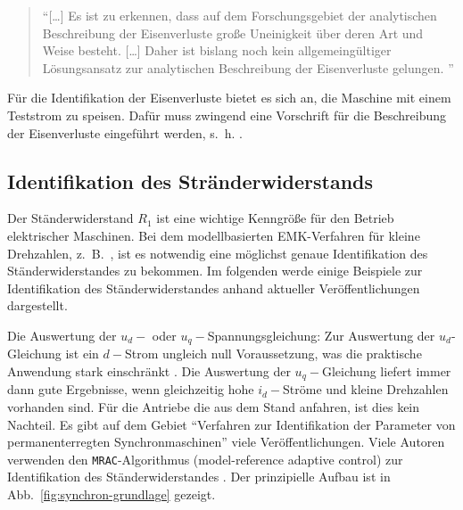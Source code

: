 \documentclass[conference,twocolumn]{IEEEtran}
\begin{document}
\begin{quote}
\enquote{[\ldots] Es ist zu erkennen, dass auf dem Forschungsgebiet der analytischen Beschreibung
der Eisenverluste große Uneinigkeit über deren Art und Weise besteht. [\ldots] Daher ist bislang
noch kein allgemeingültiger Lösungsansatz zur analytischen Beschreibung der
Eisenverluste gelungen. \autocite[S.~65]{Kellner2012}} 
\end{quote}

Für die Identifikation der Eisenverluste bietet es sich an, die Maschine mit einem Teststrom zu speisen.
Dafür muss zwingend eine Vorschrift für die Beschreibung der Eisenverluste eingeführt werden, s.~h. \autocite[S.~75]{Kellner2012}.

\subsection{Identifikation des Stränderwiderstands}\label{sec:stator-ident}

Der Ständerwiderstand $R_1$ ist eine wichtige Kenngröße für den Betrieb elektrischer Maschinen.
Bei dem modellbasierten EMK-Verfahren für kleine Drehzahlen, z.\ B.\ \autocite{genduso}, ist es notwendig eine möglichst genaue Identifikation des Ständerwiderstandes zu bekommen.
Im folgenden werde einige Beispiele zur Identifikation des Ständerwiderstandes anhand aktueller Veröffentlichungen dargestellt.

Die Auswertung der $u_d-$ oder $u_q-$Spannungsgleichung: Zur Auswertung der $u_d$-Gleichung ist ein $d-$Strom ungleich null Voraussetzung, was die praktische Anwendung stark einschränkt \autocite{Kellner2012}.
Die Auswertung der $u_q-$Gleichung liefert immer dann gute Ergebnisse, wenn gleichzeitig hohe $i_d-$Ströme und kleine Drehzahlen vorhanden sind.
Für die Antriebe die aus dem Stand anfahren, ist dies kein Nachteil.
Es gibt auf dem Gebiet \enquote{Verfahren zur Identifikation der Parameter von permanenterregten Synchronmaschinen} viele Veröffentlichungen.
Viele Autoren verwenden den \texttt{MRAC}-Algorithmus (model-reference adaptive control) zur Identifikation des Ständerwiderstandes \autocite{slotine_applied_1991}.
Der prinzipielle Aufbau ist in Abb.~\ref{fig:synchron-grundlage} gezeigt.
\end{document}
